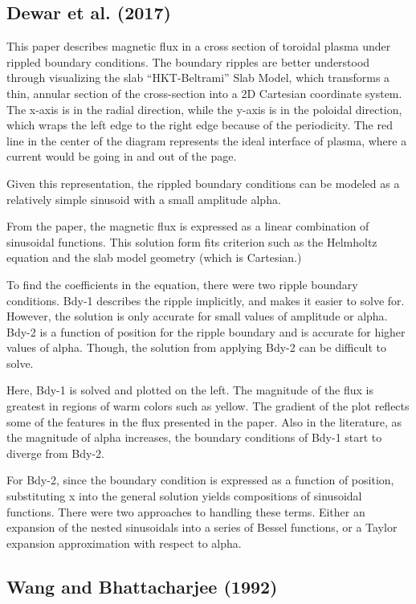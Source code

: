 \documentclass[../main.tex]{subfiles}
\begin{document}
\subsection{Dewar et al. (2017)}
This paper describes magnetic flux in a cross section of toroidal plasma under rippled boundary conditions. The boundary ripples are better understood through visualizing the slab “HKT-Beltrami” Slab Model, which transforms a thin, annular section of the cross-section into a 2D Cartesian coordinate system. The x-axis is in the radial direction, while the y-axis is in the poloidal direction, which wraps the left edge to the right edge because of the periodicity. The red line in the center of the diagram represents the ideal interface of plasma, where a current would be going in and out of the page.

Given this representation, the rippled boundary conditions can be modeled as a relatively simple sinusoid with a small amplitude alpha.

From the paper, the magnetic flux is expressed as a linear combination of sinusoidal functions. This solution form fits criterion such as the Helmholtz equation and the slab model geometry (which is Cartesian.)

To find the coefficients in the equation, there were two ripple boundary conditions. Bdy-1 describes the ripple implicitly, and makes it easier to solve for. However, the solution is only accurate for small values of amplitude or alpha. Bdy-2 is a function of position for the ripple boundary and is accurate for higher values of alpha. Though, the solution from applying Bdy-2 can be difficult to solve.

Here, Bdy-1 is solved and plotted on the left. The magnitude of the flux is greatest in regions of warm colors such as yellow. The gradient of the plot reflects some of the features in the flux presented in the paper. Also in the literature, as the magnitude of alpha increases, the boundary conditions of Bdy-1 start to diverge from Bdy-2.

For Bdy-2, since the boundary condition is expressed as a function of position, substituting x into the general solution yields compositions of sinusoidal functions. There were two approaches to handling these terms. Either an expansion of the nested sinusoidals into a series of Bessel functions, or a Taylor expansion approximation with respect to alpha.

\subsection{Wang and Bhattacharjee (1992)}
\end{document}
